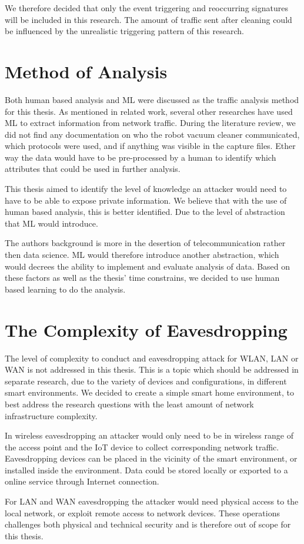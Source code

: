 We therefore decided that only the event triggering and reoccurring signatures will be included in this research. The amount of traffic sent after cleaning could be influenced by the unrealistic triggering pattern of this research. 

\section{Method of Analysis}
Both human based analysis and ML were discussed as the traffic analysis method for this thesis. As mentioned in related work, several other researches have used ML to extract information from network traffic. During the literature review, we did not find any documentation on who the robot vacuum cleaner communicated, which protocols were used, and if anything was visible in the capture files. Ether way the data would have to be pre-processed by a human to identify which attributes that could be used in further analysis.

This thesis aimed to identify the level of knowledge an attacker would need to have to be able to expose private information. We believe that with the use of human based analysis, this is better identified. Due to the level of abstraction that ML would introduce. 

The authors background is more in the desertion of telecommunication rather then data science. ML would therefore introduce another abstraction, which would decrees the ability to implement and evaluate analysis of data. Based on these factors as well as the thesis' time constrains, we decided to use human based learning to do the analysis. 


\section{The Complexity of Eavesdropping}
The level of complexity to conduct and eavesdropping attack for WLAN, LAN or WAN is not addressed in this thesis. This is a topic which should be addressed in separate research, due to the variety of devices and configurations, in different smart environments. We decided to create a simple smart home environment, to best address the research questions with the least amount of network infrastructure complexity. 

In wireless eavesdropping an attacker would only need to be in wireless range of the access point and the IoT device to collect corresponding network traffic. Eavesdropping devices can be placed in the vicinity of the smart environment, or installed inside the environment. Data could be stored locally or exported to a online service through Internet connection. 

For LAN and WAN eavesdropping the attacker would need physical access to the local network, or exploit remote access to network devices. These operations challenges both physical and technical security and is therefore out of scope for this thesis. 

